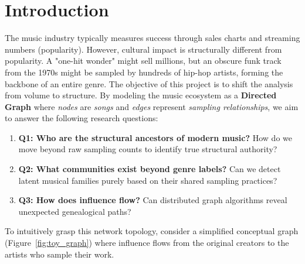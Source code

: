 \documentclass[a4paper, 12pt]{article}
\begin{document}
\tableofcontents

\clearpage

\section{Introduction}
The music industry typically measures success through sales charts and streaming numbers (popularity). However, cultural impact is structurally different from popularity. A "one-hit wonder" might sell millions, but an obscure funk track from the 1970s might be sampled by hundreds of hip-hop artists, forming the backbone of an entire genre.
The objective of this project is to shift the analysis from volume to structure. By modeling the music ecosystem as a \textbf{Directed Graph} where \emph{nodes} are \emph{songs} and \emph{edges} represent \emph{sampling relationships}, we aim to answer the following research questions:
\begin{enumerate}
    \item \textbf{Q1: Who are the structural ancestors of modern music?} How do we move beyond raw sampling counts to identify true structural authority?
    \item \textbf{Q2: What communities exist beyond genre labels?} Can we detect latent musical families purely based on their shared sampling practices?
    \item \textbf{Q3: How does influence flow?} Can distributed graph algorithms reveal unexpected genealogical paths?
\end{enumerate}

To intuitively grasp this network topology, consider a simplified conceptual graph (Figure~\ref{fig:toy_graph}) where influence flows from the original creators to the artists who sample their work.
\end{document}
